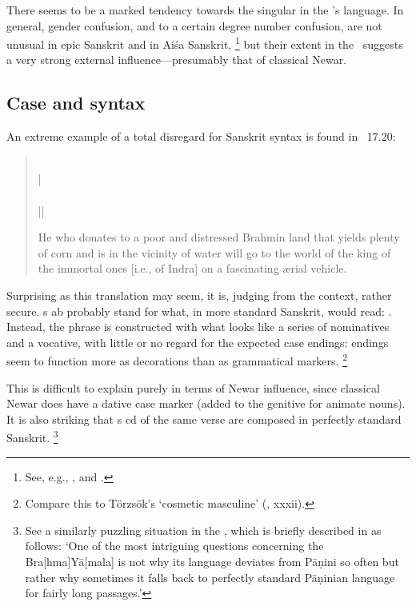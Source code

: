 There seems to be a marked tendency towards the singular in the \VSS's language. 
In general, gender confusion, and to a certain degree number confusion, are
not unusual in epic Sanskrit and in Aiśa Sanskrit,%
		\footnote{See, e.g., , and
                .}
but their extent in the \VSS\ suggests a very strong external influence---presumably
that of classical Newar.									





\subsection{Case and syntax}

An extreme example of a total disregard for Sanskrit syntax is found in \VSS~17.20:

\begin{quote}
\label{extremelanguage}
\\
 |\\
\\
 ||

He who donates to a poor and distressed Brahmin land that yields plenty of corn and is in the vicinity of water will go to the world of the king of the immortal ones [i.e., of Indra] on a fascinating \ae rial vehicle.
\end{quote}            
            
\noindent            
Surprising as this translation may seem, it is, judging from the context, rather secure. 
s ab probably stand for what, in more standard Sanskrit, would read:
.
Instead, the phrase is constructed with what looks like a series of nominatives and a
vocative, with little or no regard for the expected case endings: endings seem to function more
as decorations than as grammatical markers.%
                \footnote{Compare this to Törzsök's `cosmetic masculine' (\citeyear{TorzsokSYMthesis}, xxxii).}

This is difficult to explain purely in terms of Newar influence, since classical Newar does have
a dative case marker (added to the genitive for animate nouns). 
It is also striking that s cd of the same verse are composed in perfectly standard Sanskrit.%
		\footnote{See a similarly puzzling situation in the \BraYa, 
                 which is briefly described in  as follows:
		`One of the most intriguing questions concerning the Bra[hma]Yā[mala] 
		is not why its language deviates from Pāṇini so often 
		but rather why sometimes it falls back to perfectly standard 
		Pāṇinian language for fairly long passages.'}

